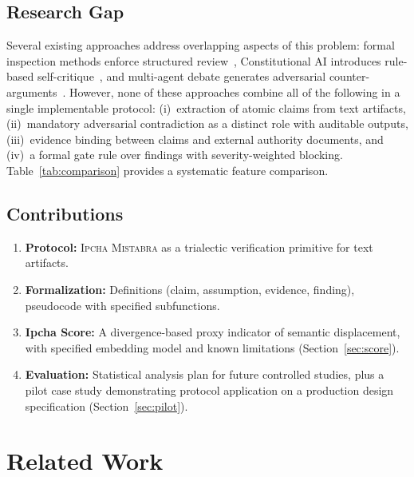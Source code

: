 \documentclass[11pt,a4paper]{article}
\newcommand{\methodname}{\textsc{Ipcha Mistabra}}
\begin{document}
\subsection{Research Gap}
Several existing approaches address overlapping aspects of this problem: formal inspection methods enforce structured review~\cite{fagan1976}, Constitutional AI introduces rule-based self-critique~\cite{bai2022}, and multi-agent debate generates adversarial counter-arguments~\cite{du_multiagent_debate}.
However, none of these approaches combine all of the following in a single implementable protocol:
(i)~extraction of atomic claims from text artifacts,
(ii)~mandatory adversarial contradiction as a distinct role with auditable outputs,
(iii)~evidence binding between claims and external authority documents, and
(iv)~a formal gate rule over findings with severity-weighted blocking.
Table~\ref{tab:comparison} provides a systematic feature comparison.

\subsection{Contributions}
\begin{enumerate}
  \item \textbf{Protocol:} \methodname{} as a trialectic verification primitive for text artifacts.
  \item \textbf{Formalization:} Definitions (claim, assumption, evidence, finding), pseudocode with specified subfunctions.
  \item \textbf{Ipcha Score:} A divergence-based proxy indicator of semantic displacement, with specified embedding model and known limitations (Section~\ref{sec:score}).
  \item \textbf{Evaluation:} Statistical analysis plan for future controlled studies, plus a pilot case study demonstrating protocol application on a production design specification (Section~\ref{sec:pilot}).
\end{enumerate}

\section{Related Work}
\label{sec:related}
\end{document}
